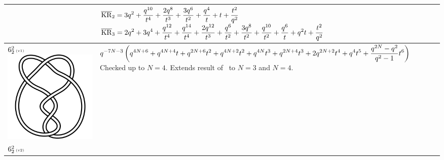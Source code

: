 \documentclass{compositio}
\theoremstyle{definition}
\numberwithin{equation}{section}
\begin{document}
{\begin{longtable}{p{}|p{}}
& 
\newline
$
\displaystyle{%
\overline{\KR}_{2} = 3 q^2+\frac{q^{10}}{t^4}+\frac{2 q^8}{t^3}+\frac{3 q^6}{t^2}+\frac{q^4}{t}+t+\frac{t^2}{q^2}
}
$
\newline 
$
\displaystyle{%
\overline{\KR}_{3} = 2 q^2+3 q^4+\frac{q^{12}}{t^4}+\frac{q^{14}}{t^4}+\frac{2 q^{12}}{t^3}+\frac{q^6}{t^2}+\frac{3 q^8}{t^2}+\frac{q^{10}}{t^2}+\frac{q^6}{t}+q^2 t+\frac{t^2}{q^2}
}
$
\newline
\\
\hline
$6_{2}^2\,\text{{\tiny (v1)}}$ 
\includegraphics[scale=0.07,angle=0]{link6_2_2.pdf} 
& 
\newline
$
\displaystyle{%
q^{-7 N-3} \left(q^{4 N+6}+q^{4 N+4} t+q^{2 N+6} t^2+q^{4 N+2} t^2+q^{4 N} t^3+q^{2 N+4} t^3+2 q^{2 N+2} t^4+q^4 t^5+\frac{q^{2 N} -q^2}{q^2-1} t^6\right)
}
$
\newline\newline\newline
Checked up to $N=4$. Extends result of~\cite{r0508510} to $N=3$ and $N=4$.
\\
\hline
$6_{2}^2\,\text{{\tiny (v2)}}$ 

\end{longtable}}
\end{document}
